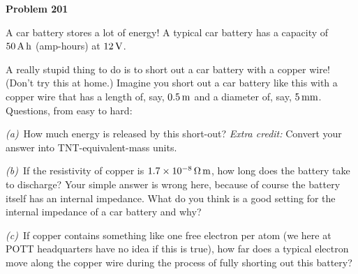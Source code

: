 \documentclass[12pt]{article}
\begin{document}
\begin{pottproblem}
\textbf{Problem 201}

A car battery stores a lot of energy!
A typical car battery has a capacity of $50\,\mathrm{A}\,\mathrm{h}$ (amp-hours) at $12\,\mathrm{V}$.

A really stupid thing to do is to short out a car battery with a copper wire!
(Don't try this at home.)
Imagine you short out a car battery like this with a copper wire that has a
length of, say, $0.5\,\mathrm{m}$ and a diameter of, say, $5\,\mathrm{mm}$.
Questions, from easy to hard:

\textsl{(a)}~How much energy is released by this short-out?
\textsl{Extra credit:} Convert your answer into TNT-equivalent-mass units.

\textsl{(b)}~If the resistivity of copper is $1.7\times 10^{-8}\,\mathrm{\Omega}\,\mathrm{m}$, how
long does the battery take to discharge? Your simple answer is wrong here, because of
course the battery itself has an internal impedance. What do you think is a good
setting for the internal impedance of a car battery and why?

\textsl{(c)}~If copper contains something like one free electron per atom
(we here at POTT headquarters have no idea if this is true), how far
does a typical electron move along the copper wire
during the process of fully shorting out this battery?

\end{pottproblem}
\end{document}
